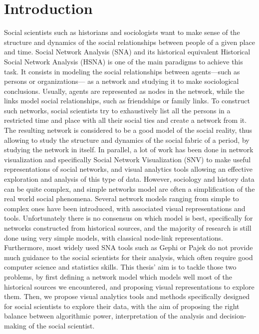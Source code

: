 


\chapter{Introduction}

Social scientists such as historians and sociologists want to make sense of the structure and dynamics of the social relationships between people of a given place and time.
Social Network Analysis (SNA) and its historical equivalent Historical Social Network Analysis (HSNA) is one of the main paradigms to achieve this task.
It consists in modeling the social relationships between agents---such as persons or organizations--- as a network and studying it to make sociological conclusions.
Usually, agents are represented as nodes in the network, while the links model social relationships, such as friendships or family links.
To construct such networks, social scientists try to exhaustively list all the persons in a restricted time and place with all their social ties and create a network from it.
The resulting network is considered to be a good model of the social reality, thus allowing to study the structure and dynamics of the social fabric of a period, by studying the network in itself.
In parallel, a lot of work has been done in network visualization and specifically Social Network Visualization (SNV) to make useful representations of social networks, and visual analytics tools allowing an effective exploration and analysis of this type of data.
However, sociology and history data can be quite complex, and simple networks model are often a simplification of the real world social phenomena.
Several network models ranging from simple to complex ones have been introduced, with associated visual representations and tools.
Unfortunately there is no consensus on which model is best, specifically for networks constructed from historical sources, and the majority of research is still done using very simple models, with classical node-link representations.
Furthermore, most widely used SNA tools such as Gephi or Pajek do not provide much guidance to the social scientists for their analysis, which often require good computer science and statistics skills.
This thesis' aim is to tackle those two problems, by first defining a network model which models well most of the historical sources we encountered, and proposing visual representations to explore them.
Then, we propose visual analytics tools and methods specifically designed for social scientists to explore their data, with the aim of proposing the right balance between algorithmic power, interpretation of the analysis and decision-making of the social scientist.

